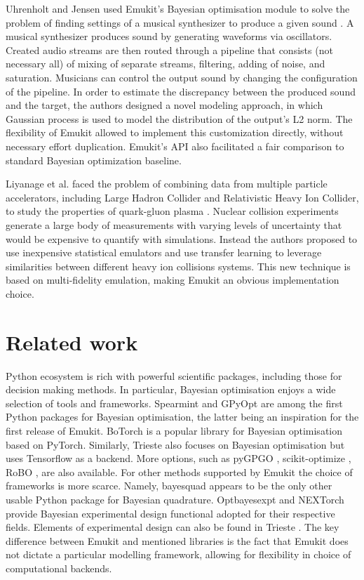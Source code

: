 Uhrenholt and Jensen used Emukit's Bayesian optimisation module to solve the problem of finding settings of a musical synthesizer to produce a given sound \cite{uhrenholt2019efficient}. A musical synthesizer produces sound by generating waveforms via oscillators. Created audio streams are then routed through a pipeline that consists (not necessary all) of mixing of separate streams, filtering, adding of noise, and saturation. Musicians can control the output sound by changing the configuration of the pipeline. In order to estimate the discrepancy between the produced sound and the target, the authors designed a novel modeling approach, in which Gaussian process is used to model the distribution of the output's L2 norm. The flexibility of Emukit allowed to implement this customization directly, without necessary effort duplication. Emukit's API also facilitated a fair comparison to standard Bayesian optimization baseline.

Liyanage et al. faced the problem of combining data from multiple particle accelerators, including Large Hadron Collider and Relativistic Heavy Ion Collider, to study the properties of quark-gluon plasma \cite{PhysRevC105034910}. Nuclear collision experiments generate a large body of measurements with varying levels of uncertainty that would be expensive to quantify with simulations. Instead the authors proposed to use inexpensive statistical emulators and use transfer learning to leverage similarities between different heavy ion collisions systems. This new technique is based on multi-fidelity emulation, making Emukit an obvious implementation choice.

\section{Related work}
Python ecosystem is rich with powerful scientific packages, including those for decision making methods. In particular, Bayesian optimisation enjoys a wide selection of tools and frameworks. Spearmint \cite{snoek2012practical} and GPyOpt \cite{gpyopt2016} are among the first Python packages for Bayesian optimisation, the latter being an inspiration for the first release of Emukit. BoTorch \cite{balandat2020botorch} is a popular library for Bayesian optimisation based on PyTorch. Similarly, Trieste \cite{picheny2023trieste} also focuses on Bayesian optimisation but uses Tensorflow as a backend. More options, such as pyGPGO \cite{jimenez2017pygpgo}, scikit-optimize \cite{louppe2017bayesian}, RoBO \cite{klein-bayesopt17}, are also available. For other methods supported by Emukit the choice of frameworks is more scarce. Namely, bayesquad \cite{Charles2013} appears to be the only other usable Python package for Bayesian quadrature. Optbayesexpt \cite{mcmichael2021optbayesexpt} and NEXTorch \cite{wang2021nextorch} provide Bayesian experimental design functional adopted for their respective fields. Elements of experimental design can also be found in Trieste \cite{picheny2023trieste}. The key difference between Emukit and mentioned libraries is the fact that Emukit does not dictate a particular modelling framework, allowing for flexibility in choice of computational backends.

